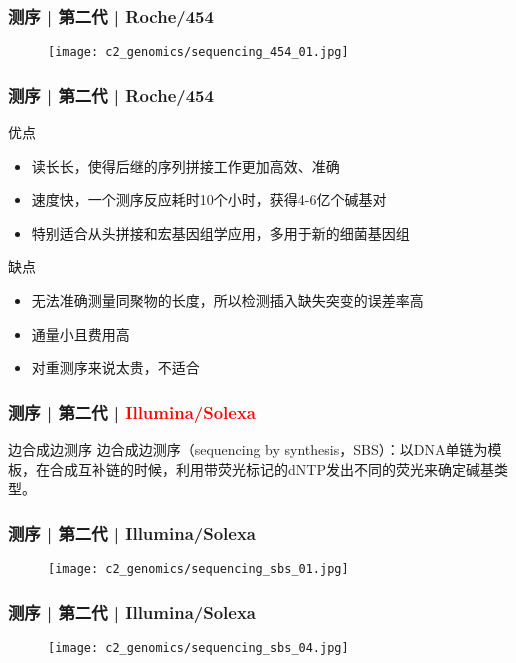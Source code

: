 \begin{frame}
  \frametitle{测序 | 第二代 | Roche/454}
  \begin{figure}
    \centering
    \texttt{[image: c2\_genomics/sequencing\_454\_01.jpg]}
  \end{figure}
\end{frame}

\begin{frame}
  \frametitle{测序 | 第二代 | Roche/454}
  \begin{block}{优点}
    \begin{itemize}
      \item 读长长，使得后继的序列拼接工作更加高效、准确
      \item 速度快，一个测序反应耗时10个小时，获得4-6亿个碱基对
      \item 特别适合从头拼接和宏基因组学应用，多用于新的细菌基因组
    \end{itemize}
  \end{block}
  \pause
  \begin{block}{缺点}
    \begin{itemize}
      \item 无法准确测量同聚物的长度，所以检测插入缺失突变的误差率高
      \item 通量小且费用高
      \item 对重测序来说太贵，不适合
    \end{itemize}
  \end{block}
\end{frame}

\begin{frame}
  \frametitle{测序 | 第二代 | \textcolor{red}{Illumina/Solexa}}
  \begin{block}{边合成边测序}
边合成边测序（sequencing by synthesis，SBS）：以DNA单链为模板，在合成互补链的时候，利用带荧光标记的dNTP发出不同的荧光来确定碱基类型。
  \end{block}
\end{frame}

\begin{frame}
  \frametitle{测序 | 第二代 | Illumina/Solexa}
  \begin{figure}
    \centering
    \texttt{[image: c2\_genomics/sequencing\_sbs\_01.jpg]}
  \end{figure}
\end{frame}

\begin{frame}
  \frametitle{测序 | 第二代 | Illumina/Solexa}
  \begin{figure}
    \centering
    \texttt{[image: c2\_genomics/sequencing\_sbs\_04.jpg]}
  \end{figure}
\end{frame}

